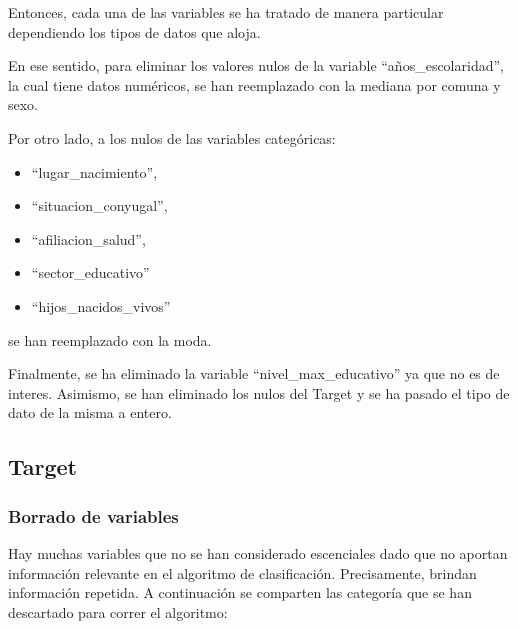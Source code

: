 \documentclass[a4paper]{article}
\begin{document}
        Entonces, cada una de las variables se ha tratado de manera particular dependiendo los tipos de datos que aloja.
        
\vspace{1cm}

        En ese sentido, para eliminar los valores nulos de la variable ``años\_escolaridad'', la cual tiene datos numéricos, se han reemplazado con la mediana por comuna y sexo.
        
\vspace{1cm}

        Por otro lado, a los nulos de las variables categóricas:
        \begin{itemize}
            \item ``lugar\_nacimiento'',
            \item ``situacion\_conyugal'',
            \item ``afiliacion\_salud'',
            \item ``sector\_educativo''
            \item ``hijos\_nacidos\_vivos''
        \end{itemize}
        se han reemplazado con la moda.
        
 \vspace{1cm}    
 
        Finalmente, se ha eliminado la variable ``nivel\_max\_educativo'' ya que no es de interes. Asimismo, se han eliminado los nulos del Target y se ha pasado el tipo de dato de la misma a entero. 
        

    \subsection{Target}

        \subsubsection{Borrado de variables}
    
        Hay muchas variables que no se han considerado escenciales dado que no aportan información relevante en el algoritmo de clasificación. Precisamente, brindan información repetida. A continuación se comparten las categoría que se han descartado para correr el algoritmo: 
\end{document}
